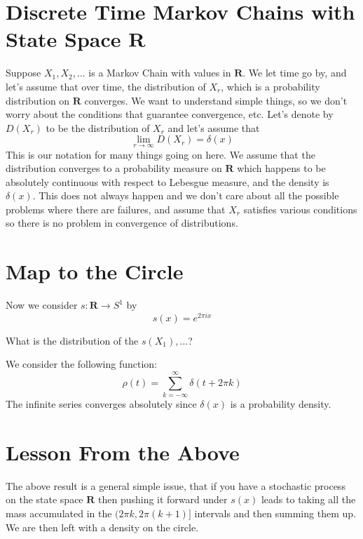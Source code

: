 \documentclass{amsart}
\author{Zulfikar Moinuddin Ahmed}
\date{\today}
\begin{document}
\maketitle

\section{Discrete Time Markov Chains with State Space $\mathbf{R}$}

Suppose $X_1,X_2,\dots$ is a Markov Chain with values in $\mathbf{R}$.  We let time go by, and let's assume that over time, the distribution of $X_r$, which is a probability distribution on $\mathbf{R}$ converges.  We want to understand simple things, so we don't worry about the conditions that guarantee convergence, etc.  Let's denote by $D(X_r)$ to be the distribution of $X_r$ and let's assume that 
\[
\lim_{r\rightarrow\infty } D(X_r) = \delta(x)
\]
This is our notation for many things going on here.  We assume that the distribution converges to a probability measure on $\mathbf{R}$ which happens to be absolutely continuous with respect to Lebesgue measure, and the density is $\delta(x)$.  This does not always happen and we don't care about all the possible problems where there are failures, and assume that $X_r$ satisfies various conditions so there is no problem in convergence of distributions.

\section{Map to the Circle}

Now we consider $s:\mathbf{R}\rightarrow S^1$ by
\[
s(x) = e^{2 \pi i x}
\]

What is the distribution of the $s(X_1),\dots$?

We consider the following function:
\[
\rho(t) = \sum_{k= -\infty} ^ {\infty} \delta( t + 2\pi k)
\]
The infinite series converges absolutely since $\delta(x)$ is a probability density.

\section{Lesson From the Above}

The above result is a general simple issue, that if you have a stochastic process on the state space $\mathbf{R}$ then pushing it forward under $s(x)$ leads to taking all the mass accumulated in the $(2\pi k, 2\pi (k+1)]$ intervals and then summing them up.  We are then left with a density on the circle.
\end{document}
